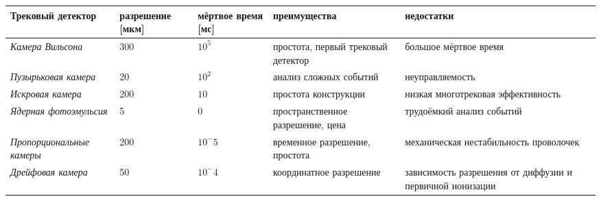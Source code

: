 \clearpage
\thispagestyle{empty}
\begin{landscape}
  \vspace*{1.3cm}
  \hspace*{-1.0cm}
  \large
  \begin{tabular}[c]{|p{6.0cm}|p{2.0cm}|p{1.8cm}|p{5.0cm}|p{5.0cm}|}
    \hline
    Трековый детектор & разреше\-ние [мкм] & мёртвое время [мс] &
    преимущества & недостатки
    \tabularnewline
    \hline
    \hline
    \slshape Камера Вильсона & 300 & $10^5$ & простота, первый трековый
    детектор & большое мёртвое время
    \tabularnewline
    \hline
    \slshape Пузырьковая камера & 20 & $10^2$ & анализ сложных
    событий & неуправляемость
    \tabularnewline
    \hline
    \slshape Искровая камера & 200 & $10$ & простота конструкции
    & низкая многотрековая эффективность
    \tabularnewline
    \hline
    \slshape Ядерная фотоэмульсия & 5 & 0 & пространственное
    разрешение, цена & трудоёмкий анализ событий
    \tabularnewline
    \hline
    \slshape Пропорциональные камеры & 200 & $10^-5$ & временное
    разрешение, простота & механическая нестабильность проволочек
    \tabularnewline
    \hline
    \slshape Дрейфовая камера & 50 & $10^-4$ & координатное
    разрешение & зависимость разрешения от диффузии и первичной
    ионизации
    \tabularnewline
    \hline
  \end{tabular}
\end{landscape}



